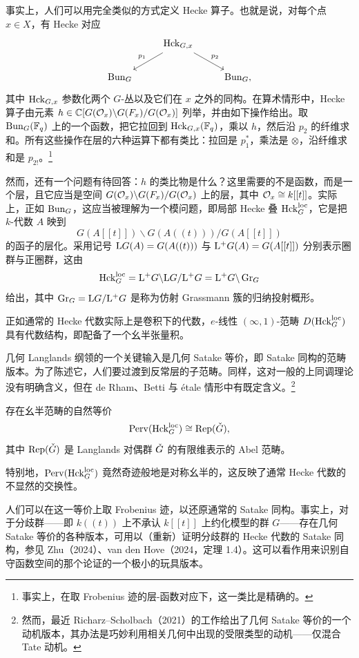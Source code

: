 事实上，人们可以用完全类似的方式定义 Hecke 算子。也就是说，对每个点 $x \in X$，有 Hecke 对应
\[
\begin{tikzcd}
& \Hck_{G,x} \arrow[dl, "p_1"'] \arrow[dr, "p_2"] & \\
\Bun_G & & \Bun_G,
\end{tikzcd}
\]
其中 $\operatorname{Hck}_{G,x}$ 参数化两个 $G$-丛以及它们在 $x$ 之外的同构。在算术情形中，Hecke 算子由元素 $h \in \mathbb{C}[G(\mathcal{O}_x)\backslash G(F_x)/G(\mathcal{O}_x)]$ 列举，并由如下操作给出。取 $\operatorname{Bun}_G(\mathbb{F}_q)$ 上的一个函数，把它拉回到 $\operatorname{Hck}_{G,x}(\mathbb{F}_q)$，乘以 $h$，然后沿 $p_2$ 的纤维求和。所有这些操作在层的六种运算下都有类比：拉回是 $p_1^*$，乘法是 $\otimes$，沿纤维求和是 $p_{2!}$。\footnote{事实上，在取 Frobenius 迹的层-函数对应下，这一类比是精确的。}

然而，还有一个问题有待回答：$h$ 的类比物是什么？这里需要的不是函数，而是一个层，且它应当是空间 $G(\mathcal{O}_x)\backslash G(F_x)/G(\mathcal{O}_x)$ 上的层，其中 $\mathcal{O}_x \cong k[[t]]$。实际上，正如 $\operatorname{Bun}_G$，这应当被理解为一个模问题，即局部 Hecke 叠 $\operatorname{Hck}^{\mathrm{loc}}_G$，它是把 $k$-代数 $A$ 映到
\[
G(A[[t]])\backslash G(A((t)))/G(A[[t]])
\]
的函子的层化。采用记号 $\mathrm{L}G(A) = G(A((t)))$ 与 $\mathrm{L}^{+}G(A) = G(A[[t]])$ 分别表示圈群与正圈群，这由
\[
\operatorname{Hck}^{\mathrm{loc}}_G = \mathrm{L}^{+}G\backslash \mathrm{L}G/\mathrm{L}^{+}G = \mathrm{L}^{+}G\backslash \operatorname{Gr}_G
\]
给出，其中 $\operatorname{Gr}_G = \mathrm{L}G/\mathrm{L}^{+}G$ 是称为仿射 Grassmann 簇的归纳投射概形。

正如通常的 Hecke 代数实际上是卷积下的代数，$e$-线性 $(\infty,1)$-范畴 $D(\operatorname{Hck}^{\mathrm{loc}}_G)$ 具有代数结构，即配备了一个幺半张量积。

几何 Langlands 纲领的一个关键输入是几何 Satake 等价，即 Satake 同构的范畴版本。为了陈述它，人们要过渡到反常层的子范畴。同样，这对一般的上同调理论没有明确含义，但在 de Rham、Betti 与 étale 情形中有既定含义。\footnote{然而，最近 Richarz–Scholbach（2021）的工作给出了几何 Satake 等价的一个动机版本，其办法是巧妙利用相关几何中出现的受限类型的动机——仅混合 Tate 动机。}

\begin{theorem}
存在幺半范畴的自然等价
\[
\operatorname{Perv}(\operatorname{Hck}^{\mathrm{loc}}_G) \cong \operatorname{Rep}(\check{G}),
\]
其中 $\operatorname{Rep}(\check{G})$ 是 Langlands 对偶群 $\check{G}$ 的有限维表示的 Abel 范畴。
\end{theorem}

特别地，$\operatorname{Perv}(\operatorname{Hck}^{\mathrm{loc}}_G)$ 竟然奇迹般地是对称幺半的，这反映了通常 Hecke 代数的不显然的交换性。

\begin{remark}
人们可以在这一等价上取 Frobenius 迹，以还原通常的 Satake 同构。事实上，对于分歧群——即 $k((t))$ 上不承认 $k[[t]]$ 上约化模型的群 $G$——存在几何 Satake 等价的各种版本，可用以（重新）证明分歧群的 Hecke 代数的 Satake 同构，参见 Zhu（2024）、van den Hove（2024，定理 1.4）。这可以看作用来识别自守函数空间的那个论证的一个极小的玩具版本。
\end{remark}

